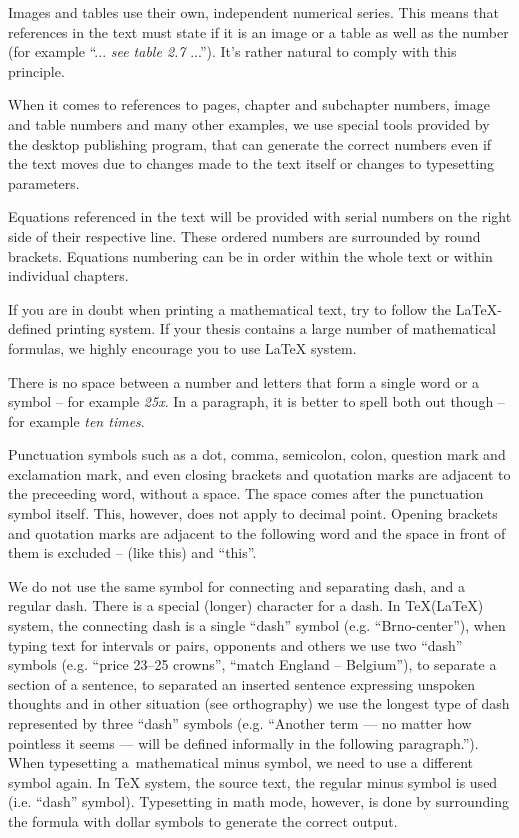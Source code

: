 Images and tables use their own, independent numerical series. This means that references in the text must state if it is an image or a table as well as the number (for example ``... {\it see table 2.7} ...''). It's rather natural to comply with this principle.

When it comes to references to pages, chapter and subchapter numbers, image and table numbers and many other examples, we use special tools provided by the desktop publishing program, that can generate the correct numbers even if the text moves due to changes made to the text itself or changes to typesetting parameters.

Equations referenced in the text will be provided with serial numbers on the right side of their respective line. These ordered numbers are surrounded by round brackets. Equations numbering can be in order within the whole text or within individual chapters.

If you are in doubt when printing a mathematical text, try to follow the LaTeX-defined printing system. If your thesis contains a large number of mathematical formulas, we highly encourage you to use LaTeX system.

There is no space between a number and letters that form a single word or a symbol -- for example {\it 25x}. In a paragraph, it is better to spell both out though -- for example {\it ten times}.

Punctuation symbols such as a dot, comma, semicolon, colon, question mark and exclamation mark, and even closing brackets and quotation marks are adjacent to the preceeding word, without a space. The space comes after the punctuation symbol itself. This, however, does not apply to decimal point. Opening brackets and quotation marks are adjacent to the following word and the space in front of them is excluded -- (like this) and ``this''.

We do not use the same symbol for connecting and separating dash, and a regular dash. There is a special (longer) character for a dash. In \TeX (\LaTeX ) system, the connecting dash is a single ``dash'' symbol (e.g. ``Brno-center''), when typing text for intervals or pairs, opponents and others we use two ``dash'' symbols (e.g. ``price 23--25 crowns'', ``match England -- Belgium''), to separate a section of a sentence, to separated an inserted sentence expressing unspoken thoughts and in other situation (see orthography) we use the longest type of dash represented by three ``dash'' symbols (e.g. ``Another term --- no matter how pointless it seems --- will be defined informally in the following paragraph.''). When typesetting a~mathematical minus symbol, we need to use a different symbol again. In TeX system, the source text, the regular minus symbol is used (i.e. ``dash'' symbol). Typesetting in math mode, however, is done by surrounding the formula with dollar symbols to generate the correct output.

